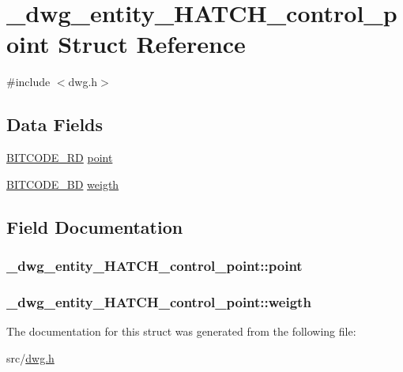 \hypertarget{struct__dwg__entity__HATCH__control__point}{\section{\-\_\-dwg\-\_\-entity\-\_\-\-H\-A\-T\-C\-H\-\_\-control\-\_\-point \-Struct \-Reference}
\label{struct__dwg__entity__HATCH__control__point}
}


{\ttfamily \#include $<$dwg.\-h$>$}

\subsection*{\-Data \-Fields}
\begin{DoxyCompactItemize}
\item 
\hyperlink{dwg_8h_a1d23a9bc9a02453876b244dc6706f6a6}{\-B\-I\-T\-C\-O\-D\-E\-\_\-R\-D} \hyperlink{struct__dwg__entity__HATCH__control__point_a4a944764bb80aa28476b06e8a6c809db}{point}
\item 
\hyperlink{dwg_8h_a3c1e6781466b74ba07785d57da70ed97}{\-B\-I\-T\-C\-O\-D\-E\-\_\-\-B\-D} \hyperlink{struct__dwg__entity__HATCH__control__point_a7046d73ddb046bd42dfd0011d68afd4d}{weigth}
\end{DoxyCompactItemize}


\subsection{\-Field \-Documentation}
\hypertarget{struct__dwg__entity__HATCH__control__point_a4a944764bb80aa28476b06e8a6c809db}{
\subsubsection[{point}]{ {\bf \-\_\-dwg\-\_\-entity\-\_\-\-H\-A\-T\-C\-H\-\_\-control\-\_\-point\-::point}}}\label{struct__dwg__entity__HATCH__control__point_a4a944764bb80aa28476b06e8a6c809db}
\hypertarget{struct__dwg__entity__HATCH__control__point_a7046d73ddb046bd42dfd0011d68afd4d}{
\subsubsection[{weigth}]{ {\bf \-\_\-dwg\-\_\-entity\-\_\-\-H\-A\-T\-C\-H\-\_\-control\-\_\-point\-::weigth}}}\label{struct__dwg__entity__HATCH__control__point_a7046d73ddb046bd42dfd0011d68afd4d}


\-The documentation for this struct was generated from the following file\-:\begin{DoxyCompactItemize}
\item 
src/\hyperlink{dwg_8h}{dwg.\-h}\end{DoxyCompactItemize}
